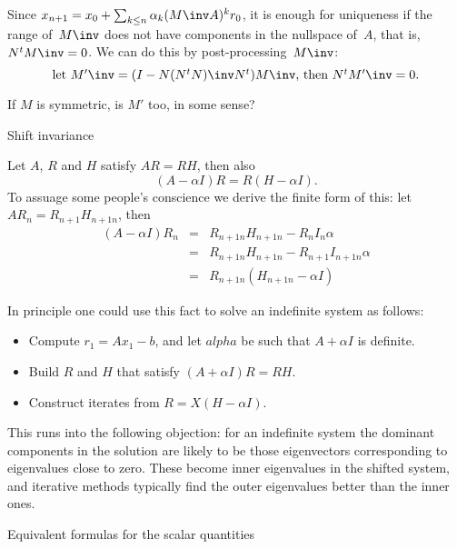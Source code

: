 \documentclass[11pt]{artikel3}
\begin{document}
\begin{Outline}
Since $x_{n+1}=x_0+\sum_{k\leq n}\alpha_k(M\inv A)^kr_0$, it is enough
for uniqueness if the range of~$M\inv$ does not have components in the
nullspace of~$A$, that is,~$N^tM\inv=0$. We can do this by
post-processing~$M\inv$:
\[ \hbox{let ${M'}\inv=(I-N(N^tN)\inv N^t)M\inv$, then $N^t{M'}\inv=0$.} \]
\begin{question}
  If $M$ is symmetric, is $M'$ too, in some sense?
\end{question}



 {Shift invariance}
\FurtherReading

Let $A$, $R$ and $H$ satisfy $AR=RH$, then also
\[ (A-\alpha I)R = R(H-\alpha I). \]
To assuage some people's conscience we derive the finite form
of this: let $AR_n=R_{n+1}H_{n+1n}$, then
\begin{eqnarray*}
    (A-\alpha I)R_n&=&R_{n+1n}H_{n+1n}-R_nI_n\alpha\\
                &=&R_{n+1n}H_{n+1n}-R_{n+1}I_{n+1n}\alpha\\
                &=&R_{n+1n}(H_{n+1n}-\alpha I)
\end{eqnarray*}

In principle one could use this fact to solve an indefinite system
as follows:
\begin{itemize}
\item Compute $r_1=Ax_1-b$, and let $alpha$ be such that
$A+\alpha I$ is definite.
\item Build $R$ and $H$ that satisfy $(A+\alpha I)R=RH$.
\item Construct iterates from $R=X(H-\alpha I)$.
\end{itemize}
This runs into the following objection: for an indefinite system
the dominant components in the solution are likely to be those
eigenvectors corresponding to eigenvalues close to zero. These become
inner eigenvalues in the shifted system, and iterative methods typically
find the outer eigenvalues better than the inner ones.

 {Equivalent formulas for the scalar quantities}
        \label{sec:unsync}
\FurtherReading


\end{Outline}
\end{document}
